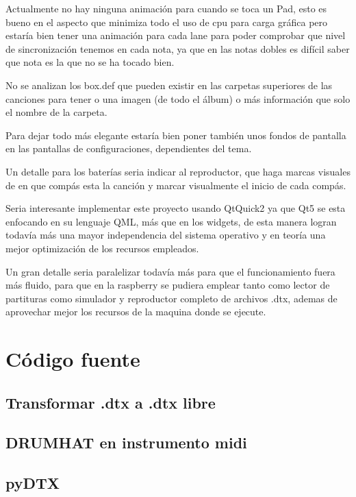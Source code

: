 \documentclass[a4paper,11pt,oneside]{book}
\begin{document}
Actualmente no hay ninguna animación para cuando se toca un Pad, esto es bueno en el aspecto que minimiza todo el uso de cpu para carga gráfica pero estaría bien tener una animación para cada lane para poder comprobar que nivel de sincronización tenemos en cada nota, ya que en las notas dobles es difícil saber que nota es la que no se ha tocado bien.

No se analizan los box.def que pueden existir en las carpetas superiores de las canciones para tener o una imagen (de todo el álbum) o más información que solo el nombre de la carpeta.

Para dejar todo más elegante estaría bien poner también unos fondos de pantalla en las pantallas de configuraciones, dependientes del tema.

Un detalle para los baterías seria indicar al reproductor, que haga marcas visuales de en que compás esta la canción y marcar visualmente el inicio de cada compás.

Seria interesante implementar este proyecto usando QtQuick2 ya que Qt5 se esta enfocando en su lenguaje QML, más que en los widgets, de esta manera logran todavía más una mayor independencia del sistema operativo y en teoría una mejor optimización de los recursos empleados.

Un gran detalle seria paralelizar todavía más para que el funcionamiento fuera más fluido, para que en la raspberry se pudiera emplear tanto como lector de partituras como simulador y reproductor completo de archivos .dtx, ademas de aprovechar mejor los recursos de la maquina donde se ejecute.

\appendix


\chapter{Código fuente}
\section{Transformar .dtx a .dtx libre}



\section{DRUMHAT en instrumento midi}


\section{pyDTX}
\end{document}

